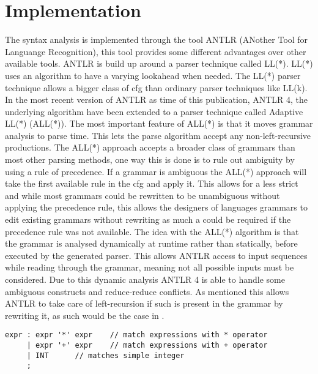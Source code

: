 \section{Implementation}

The syntax analysis is implemented through the tool ANTLR (ANother Tool for Languange Recognition), this tool provides some different advantages over other available tools.
ANTLR is build up around a parser technique called LL(*).
LL(*) uses an algorithm to have a varying lookahead when needed.
The LL(*) parser technique allows a bigger class of \acrshort{cfg} than ordinary parser techniques like LL(k).
In the most recent version of ANTLR as time of this publication, ANTLR 4, the underlying algorithm have been extended to a parser technique called Adaptive LL(*) (ALL(*)).
The most important feature of ALL(*) is that it moves grammar analysis to parse time. 
This lets the parse algorithm accept any non-left-recursive productions.
The ALL(*) approach accepts a broader class of grammars than most other parsing methods, one way this is done is to rule out ambiguity by using a rule of precedence.
If a grammar is ambiguous the ALL(*) approach will take the first  available rule in the \acrshort{cfg} and apply it.
This allows for a less strict  and while most grammars could be rewritten to be unambiguous without applying the precedence rule, this allows the designers of languages grammars to edit existing grammars without rewriting as much a could be required if the precedence rule was not available.	
The idea with the ALL(*) algorithm is that the grammar is analysed dynamically at runtime rather than statically, before executed by the generated parser.
This allows ANTLR access to input sequences while reading through the grammar, meaning not all possible inputs must be considered.
Due to this dynamic analysis ANTLR 4 is able to handle some ambiguous constructs and reduce-reduce conflicts.
As mentioned this allows ANTLR to take care of left-recursion if such is present in the grammar by rewriting it, as such would be the case in .

\begin{lstlisting}[caption=An ambiguous rule for expr,frame=tlrb,label={lst:amb}]
expr : expr '*' expr 	// match expressions with * operator
     | expr '+' expr 	// match expressions with + operator
     | INT 		// matches simple integer
     ;
\end{lstlisting}


